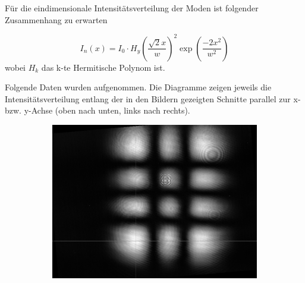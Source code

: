 \documentclass[bigchapter,colorback,accentcolor=tud4b,linedtoc,11pt]{tudreport}
\numberwithin{equation}{subsection}
\begin{document}
Für die eindimensionale Intensitätsverteilung der Moden ist folgender Zusammenhang zu erwarten
 
$$I_{n}(x) = I_0 \cdot  H_y \left( \frac{\sqrt{2}x}{w} \right)^2 \exp \left( \frac{-2x^2}{w^2} \right)  $$
\cite{TransModeIntensity}
wobei $H_k$ das k-te Hermitische Polynom ist.

Folgende Daten wurden aufgenommen. Die Diagramme zeigen jeweils die Intensitätsverteilung entlang der in den Bildern gezeigten Schnitte parallel zur x- bzw. y-Achse (oben nach unten, links nach rechts).

\begin{figure}[h]
        \centering
        \begin{subfigure}{0.5\textwidth}
                \includegraphics[width=\textwidth]{img/TEM23.png}
        \end{subfigure}%
        ~ %
        \begin{subfigure}{0.5\textwidth}
        \end{subfigure}
\end{figure}
\end{document}
